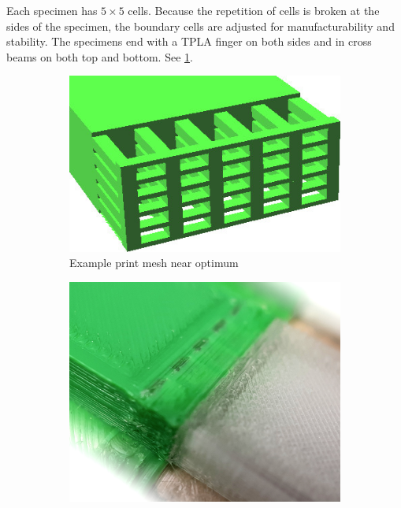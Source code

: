 Each specimen has $5\times5$ cells.
Because the repetition of cells is broken at the sides of the specimen, the boundary cells are adjusted for manufacturability and stability.
The specimens end with a TPLA finger on both sides and in cross beams on both top and bottom.
See \cref{fig:test_straight_boundary_cells}.

\begin{figure}
	\centering
	\begin{subfigure}[B]{.24\columnwidth}
		\centering
		\includegraphics[width=\columnwidth]{sources/testing/straight_sample.jpg}
		\caption{Example print mesh near optimum}
		\label{fig:test_straight_boundary_cells}
	\end{subfigure}
	\begin{subfigure}[B]{.24\columnwidth}
		\centering
		\includegraphics[width=\columnwidth]{sources/testing/straight_print.jpg}

\end{subfigure}
\end{figure}
